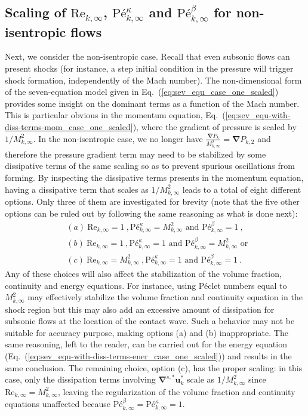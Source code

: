 \documentclass[preprint,10pt]{elsarticle}
\newcommand{\grad}{\mbold{\nabla}}
\newcommand{\gradd}[1]{\mbold{\nabla}^{#1}}
\newcommand{\mbold}[1]{\boldsymbol#1}
\renewcommand{\Re}{\textrm{Re}}
\newcommand{\Pe}{\textrm{P\'e}}
\newcommand{\eqt}[1]{Eq.~(\ref{#1})}                     %
\begin{document}
\subsection{Scaling of $\Re_{k,\infty}$, $\Pe_{k,\infty}^\kappa$ and $\Pe_{k,\infty}^\beta$ for non-isentropic flows}\label{eq:non_isent_flows}
Next, we consider the non-isentropic case. Recall that even subsonic flows can present shocks (for instance, 
a step initial condition in the pressure will trigger shock formation, independently of the Mach number). 
The non-dimensional form of the seven-equation model given in \eqt{eq:sev_equ_case_one_scaled} provides some insight on the 
dominant terms as a function of the Mach number. This is particular obvious in the momentum equation, \eqt{eq:sev_equ-with-diss-terms-mom_case_one_scaled}, 
where the gradient of pressure is scaled by $1/M_{k,\infty}^2$. In the non-isentropic case, we no longer 
have $\frac{\grad P_k}{M_{k,\infty}^2}=\grad P_{k,2}$ and therefore the pressure gradient term may need to be stabilized by 
some dissipative terms of the same scaling so as to prevent spurious oscillations from forming. 
By inspecting the dissipative terms presents in the momentum equation, having a dissipative term that 
scales as $1/M_{k,\infty}^2$ leads to a total of eight different options. Only three of them are investigated for brevity (note that the five other options can be ruled out by following the same reasoning as what is done next):
%
\begin{align}
&(a) \ \Re_{k,\infty} = 1 \ , \Pe_{k,\infty}^\kappa = M_{k,\infty}^2 \text{ and } \Pe_{k,\infty}^\beta = 1 \ , \nonumber \\
&(b) \ \Re_{k,\infty} = 1 \ , \Pe_{k,\infty}^\kappa = 1 \text{ and } \Pe_{k,\infty}^\beta = M_{k,\infty}^2 \text{ or } \nonumber \\
&(c) \ \Re_{k,\infty} = M_{k,\infty}^2 \ , \Pe_{k,\infty}^\kappa = 1 \text{ and } \Pe_{k,\infty}^\beta = 1 \ . \nonumber
\end{align}
%
Any of these choices will also affect the stabilization of the volume fraction, continuity and energy equations. 
For instance, using P\'eclet numbers equal to $M_{k,\infty}^2$ may effectively stabilize the volume fraction and continuity 
equation in the shock region but this may also add an excessive amount of dissipation for subsonic 
flows at the location of the contact wave. Such a behavior may not be suitable for accuracy purpose, 
making options (a) and (b) inappropriate. The same reasoning, left to the reader, can be carried out 
for the energy equation (\eqt{eq:sev_equ-with-diss-terms-ener_case_one_scaled}) and results in the same conclusion. The remaining 
choice, option (c), has the proper scaling: in this case, only the dissipation terms involving 
$\gradd{s,*} \mbold u_k^*$ scale as $1/M_{k,\infty}^2$ since $\Re_{k,\infty} = M_{k,\infty}^2$, leaving the 
regularization of the volume fraction and continuity equations unaffected because $\Pe_{k,\infty}^\beta = \Pe_{k,\infty}^\kappa =1$.
\end{document}
